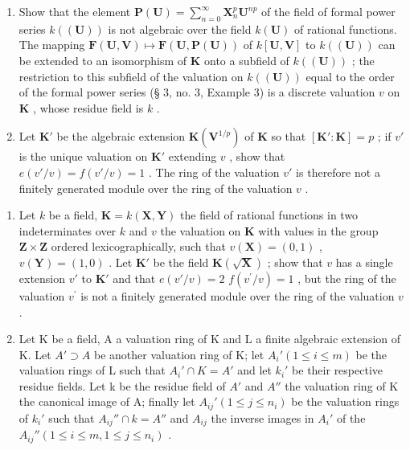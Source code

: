 \begin{enumerate}
\def\labelenumi{(\alph{enumi})}
\item
  Show that the element \(\mathbf{P}(\mathbf{U}) = \sum_{n=0}^{\infty} \mathbf{X}_n^p \mathbf{U}^{np}\) of the field of formal power series \(k((\mathbf{U}))\) is not algebraic over the field \(k(\mathbf{U})\) of rational functions. The mapping \(\mathbf{F}(\mathbf{U}, \mathbf{V}) \mapsto \mathbf{F}(\mathbf{U}, \mathbf{P}(\mathbf{U}))\) of \(k[\mathbf{U}, \mathbf{V}]\) to \(k((\mathbf{U}))\) can be extended to an isomorphism of \(\mathbf{K}\) onto a subfield of \(k((\mathbf{U}))\) ; the restriction to this subfield of the valuation on \(k((\mathbf{U}))\) equal to the order of the formal power series (§ 3, no. 3, Example 3) is a discrete valuation \(v\) on \(\mathbf{K}\) , whose residue field is \(k\) .
\item
  Let \(\mathbf{K}'\) be the algebraic extension \(\mathbf{K}(\mathbf{V}^{1/p})\) of \(\mathbf{K}\) so that \([\mathbf{K}':\mathbf{K}] = p\) ; if \(v'\) is the unique valuation on \(\mathbf{K}'\) extending \(v\) , show that \(e(v'/v) = f(v'/v) = 1\) . The ring of the valuation \(v'\) is therefore not a finitely generated module over the ring of the valuation \(v\) .
\end{enumerate}

\begin{enumerate}
\def\labelenumi{\arabic{enumi}.}
\setcounter{enumi}{3}
\item
  Let \(k\) be a field, \(\mathbf{K} = k(\mathbf{X}, \mathbf{Y})\) the field of rational functions in two indeterminates over \(k\) and \(v\) the valuation on \(\mathbf{K}\) with values in the group \(\mathbf{Z} \times \mathbf{Z}\) ordered lexicographically, such that \(v(\mathbf{X}) = (0, 1)\) , \(v(\mathbf{Y}) = (1, 0)\) . Let \(\mathbf{K}'\) be the field \(\mathbf{K}(\sqrt{\mathbf{X}})\) ; show that \(v\) has a single extension \(v'\) to \(\mathbf{K}'\) and that \(e(v'/v) = 2\) \(f(v^{\prime}/v)=1\) , but the ring of the valuation \(v^{\prime}\) is not a finitely generated module over the ring of the valuation \(v\) .
\item
  Let K be a field, A a valuation ring of K and L a finite algebraic extension of K. Let \(A' \supset A\) be another valuation ring of K; let \(A_i' (1 \leqslant i \leqslant m)\) be the valuation rings of L such that \(A_i' \cap K = A'\) and let \(k_i'\) be their respective residue fields. Let k be the residue field of \(A'\) and \(A''\) the valuation ring of K the canonical image of A; finally let \(A_{ij}' (1 \leqslant j \leqslant n_i)\) be the valuation rings of \(k_i'\) such that \(A_{ij}'' \cap k = A''\) and \(A_{ij}\) the inverse images in \(A_i'\) of the \(A_{ij}'' (1 \leqslant i \leqslant m, 1 \leqslant j \leqslant n_i)\) .
\end{enumerate}

